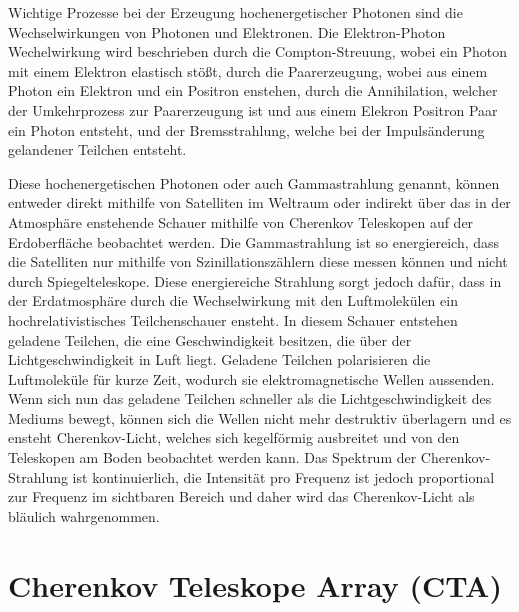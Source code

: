 Wichtige Prozesse bei der Erzeugung hochenergetischer Photonen sind die Wechselwirkungen von Photonen und Elektronen. Die
Elektron-Photon Wechelwirkung wird beschrieben durch die
Compton-Streuung, wobei ein Photon mit einem Elektron elastisch stößt, durch die Paarerzeugung, wobei aus einem Photon ein Elektron
und ein Positron enstehen, durch die Annihilation, welcher der Umkehrprozess zur Paarerzeugung ist und aus einem Elekron Positron Paar
ein Photon entsteht, und der Bremsstrahlung, welche bei der Impulsänderung gelandener Teilchen entsteht.

Diese hochenergetischen Photonen oder auch Gammastrahlung genannt, können entweder direkt mithilfe von Satelliten im Weltraum oder
indirekt über das in der Atmosphäre enstehende Schauer mithilfe von Cherenkov Teleskopen auf der Erdoberfläche beobachtet werden.
Die Gammastrahlung ist so energiereich, dass die Satelliten nur mithilfe von Szinillationszählern diese messen können und nicht
durch Spiegelteleskope. Diese energiereiche Strahlung sorgt jedoch dafür, dass in der Erdatmosphäre durch die Wechselwirkung mit
den Luftmolekülen ein hochrelativistisches Teilchenschauer ensteht. In diesem Schauer entstehen geladene Teilchen, die eine Geschwindigkeit
besitzen, die über der Lichtgeschwindigkeit in Luft liegt. Geladene Teilchen polarisieren die Luftmoleküle für kurze Zeit, wodurch sie
elektromagnetische Wellen aussenden. Wenn sich nun das geladene Teilchen schneller als die Lichtgeschwindigkeit des Mediums bewegt,
können sich die Wellen nicht mehr destruktiv überlagern und es ensteht Cherenkov-Licht, welches sich kegelförmig ausbreitet und von
den Teleskopen am Boden beobachtet werden kann. Das Spektrum der Cherenkov-Strahlung ist kontinuierlich, die Intensität pro Frequenz ist
jedoch proportional zur Frequenz im sichtbaren Bereich und daher wird das Cherenkov-Licht als bläulich wahrgenommen.

\section{Cherenkov Teleskope Array (CTA)}

